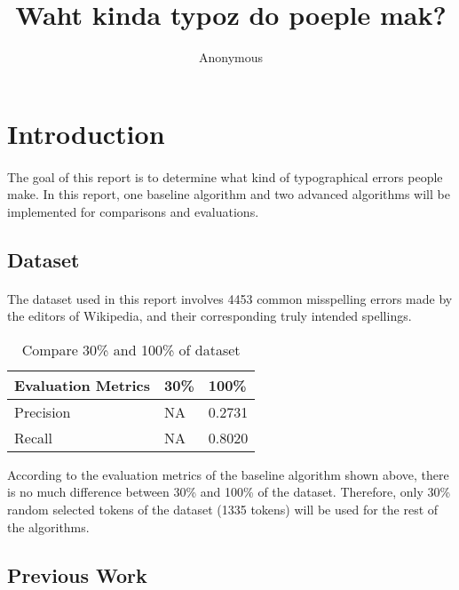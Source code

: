 \documentclass[11pt]{article}
\title{Waht kinda typoz do poeple mak?}
\author
{Anonymous}
\begin{document}
\maketitle


\section{Introduction}

\paragraph{} The goal of this report is to determine what kind of typographical errors people make. In this report, one baseline algorithm and two advanced algorithms will be implemented for comparisons and evaluations.

\subsection{Dataset}

\paragraph{} The dataset used in this report involves 4453 common misspelling errors made by the editors of Wikipedia, and their corresponding truly intended spellings.

\begin{table}[h]
 \begin{center}
\begin{tabular}{| l | l | l |}

      \hline
      Evaluation Metrics & 30\% & 100\% \\
      \hline\hline
      Precision & NA & 0.2731 \\
      Recall & NA & 0.8020 \\
      \hline

\end{tabular}
\caption{Compare 30\% and 100\% of dataset}\label{table1}
 \end{center}
\end{table}

According to the evaluation metrics of the baseline algorithm shown above, there is no much difference between 30\% and 100\% of the dataset. Therefore, only 30\% random selected tokens of the dataset (1335 tokens) will be used for the rest of the algorithms.

\subsection{Previous Work}
\end{document}
